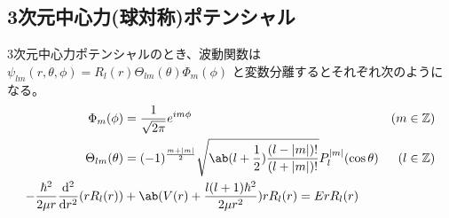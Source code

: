\documentclass[uplatex,dvipdfmx,a4paper,11pt]{jlreq}
\newcommand{\ZZ}{\mathbb{Z}}
\numberwithin{equation}{section}
\theoremstyle{definition}
\begin{document}
\subsection{3次元中心力(球対称)ポテンシャル}
\begin{proposition}
  3次元中心力ポテンシャルのとき、波動関数は $\psi_{lm}(r, \theta, \phi) = R_l(r)\Theta_{lm}(\theta)\Phi_m(\phi)$ と変数分離するとそれぞれ次のようになる。
  \begin{align}
    \Phi_m(\phi)                               & = \frac{1}{\sqrt{2\pi}}e^{im\phi}                                                                       & (m\in\ZZ) \\
    \Theta_{lm}(\theta)                        & = (-1)^{\frac{m + |m|}{2}}\sqrt{\ab(l + \frac{1}{2})\frac{(l - |m|)!}{(l + |m|)!}}P_l^{|m|}(\cos\theta) & (l\in\ZZ) \\
    - \frac{\hbar^2}{2\mu r}\dv[2]{r}(rR_l(r)) & + \ab(V(r) + \frac{l(l+1)\hbar^2}{2\mu r^2})rR_l(r) = ErR_l(r)
  \end{align}
\end{proposition}
\end{document}
